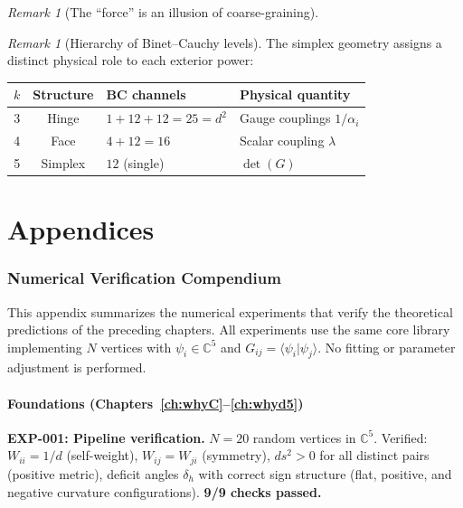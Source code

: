 \documentclass[12pt]{article}
\theoremstyle{remark}
\newtheorem{remark}[theorem]{Remark}
\theoremstyle{definition}
\newcommand{\CC}{\mathbb{C}}
\begin{document}
\begin{remark}[The ``force'' is an illusion of coarse-graining]
\begin{remark}[Hierarchy of Binet--Cauchy levels]
The simplex geometry assigns a distinct physical role to each exterior power:
\begin{center}
\begin{tabular}{ccll}
\hline
$k$ & Structure & BC channels & Physical quantity \\
\hline
3 & Hinge & $1+12+12=25=d^2$ & Gauge couplings $1/\alpha_i$ \\
4 & Face  & $4+12=16$         & Scalar coupling $\lambda$ \\
5 & Simplex & $12$ (single)   & $\det(G)$ \\
\hline
\end{tabular}
\end{center}
\end{remark}



\appendix
\part*{Appendices}

\section{Numerical Verification Compendium}
\label{app:verification}

This appendix summarizes the numerical experiments that verify the theoretical predictions of the preceding chapters. All experiments use the same core library implementing $N$ vertices with $\psi_i \in \CC^5$ and $G_{ij} = \langle\psi_i|\psi_j\rangle$. No fitting or parameter adjustment is performed.

\subsection{Foundations (Chapters~\ref{ch:whyC}--\ref{ch:whyd5})}

\textbf{EXP-001: Pipeline verification.} $N = 20$ random vertices in $\CC^5$. Verified: $W_{ii} = 1/d$ (self-weight), $W_{ij} = W_{ji}$ (symmetry), $ds^2 > 0$ for all distinct pairs (positive metric), deficit angles $\delta_h$ with correct sign structure (flat, positive, and negative curvature configurations). \textbf{9/9 checks passed.}


\end{remark}
\end{document}

